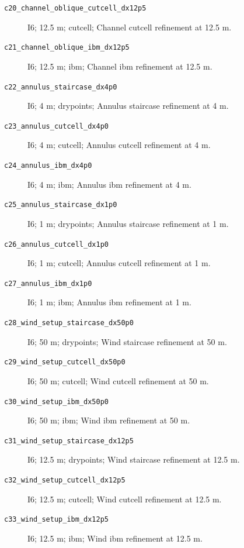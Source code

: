 \begin{description}
\item[\texttt{c20\_channel\_oblique\_cutcell\_dx12p5}] I6; 12.5 m; cutcell; Channel cutcell refinement at 12.5 m.
\item[\texttt{c21\_channel\_oblique\_ibm\_dx12p5}] I6; 12.5 m; ibm; Channel ibm refinement at 12.5 m.
\item[\texttt{c22\_annulus\_staircase\_dx4p0}] I6; 4 m; drypoints; Annulus staircase refinement at 4 m.
\item[\texttt{c23\_annulus\_cutcell\_dx4p0}] I6; 4 m; cutcell; Annulus cutcell refinement at 4 m.
\item[\texttt{c24\_annulus\_ibm\_dx4p0}] I6; 4 m; ibm; Annulus ibm refinement at 4 m.
\item[\texttt{c25\_annulus\_staircase\_dx1p0}] I6; 1 m; drypoints; Annulus staircase refinement at 1 m.
\item[\texttt{c26\_annulus\_cutcell\_dx1p0}] I6; 1 m; cutcell; Annulus cutcell refinement at 1 m.
\item[\texttt{c27\_annulus\_ibm\_dx1p0}] I6; 1 m; ibm; Annulus ibm refinement at 1 m.
\item[\texttt{c28\_wind\_setup\_staircase\_dx50p0}] I6; 50 m; drypoints; Wind staircase refinement at 50 m.
\item[\texttt{c29\_wind\_setup\_cutcell\_dx50p0}] I6; 50 m; cutcell; Wind cutcell refinement at 50 m.
\item[\texttt{c30\_wind\_setup\_ibm\_dx50p0}] I6; 50 m; ibm; Wind ibm refinement at 50 m.
\item[\texttt{c31\_wind\_setup\_staircase\_dx12p5}] I6; 12.5 m; drypoints; Wind staircase refinement at 12.5 m.
\item[\texttt{c32\_wind\_setup\_cutcell\_dx12p5}] I6; 12.5 m; cutcell; Wind cutcell refinement at 12.5 m.
\item[\texttt{c33\_wind\_setup\_ibm\_dx12p5}] I6; 12.5 m; ibm; Wind ibm refinement at 12.5 m.
\end{description}
